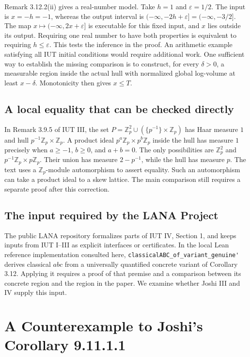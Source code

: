 \documentclass[UTF8,fontset=none,zihao=-4,a4paper]{ctexart}
\newcommand{\Z}{\mathbb Z}
\begin{document}
Remark 3.12.2(ii) gives a real-number model. Take \(h=1\) and \(\varepsilon=1/2\). The input is \(x=-h=-1\), whereas the output interval is \((-\infty,-2h+\varepsilon]=(-\infty,-3/2]\). The map \(x\mapsto(-\infty,2x+\varepsilon]\) is executable for this fixed input, and \(x\) lies outside its output. Requiring one real number to have both properties is equivalent to requiring \(h\le\varepsilon\). This tests the inference in the proof. An arithmetic example satisfying all IUT initial conditions would require additional work. One sufficient way to establish the missing comparison is to construct, for every \(\delta>0\), a measurable region inside the actual hull with normalized global log-volume at least \(x-\delta\). Monotonicity then gives \(x\le T\).\cite[Remark 3.12.2(ii), pp. 188--191]{miii}

\subsection{A local equality that can be checked directly}
In Remark 3.9.5 of IUT III, the set \(P=\Z_p^2\cup(\{p^{-1}\}\times\Z_p)\) has Haar measure \(1\) and hull \(p^{-1}\Z_p\times\Z_p\). A product ideal \(p^a\Z_p\times p^b\Z_p\) inside the hull has measure \(1\) precisely when \(a\ge-1\), \(b\ge0\), and \(a+b=0\). The only possibilities are \(\Z_p^2\) and \(p^{-1}\Z_p\times p\Z_p\). Their union has measure \(2-p^{-1}\), while the hull has measure \(p\). The text uses a \(\Z_p\)-module automorphism to assert equality. Such an automorphism can take a product ideal to a skew lattice. The main comparison still requires a separate proof after this correction.\cite[Remark 3.9.5, pp. 127--129]{miii}

\subsection{The input required by the LANA Project}
The public LANA repository formalizes parts of IUT IV, Section 1, and keeps inputs from IUT I--III as explicit interfaces or certificates. In the local Lean reference implementation consulted here, \nolinkurl{classicalABC_of_variant_genuine'} derives classical \(abc\) from a universally quantified concrete variant of Corollary 3.12. Applying it requires a proof of that premise and a comparison between its concrete region and the region in the paper. We examine whether Joshi III and IV supply this input.\cite{lana,localref,jiii,jiv}

\section{A Counterexample to Joshi's Corollary 9.11.1.1}
\end{document}
